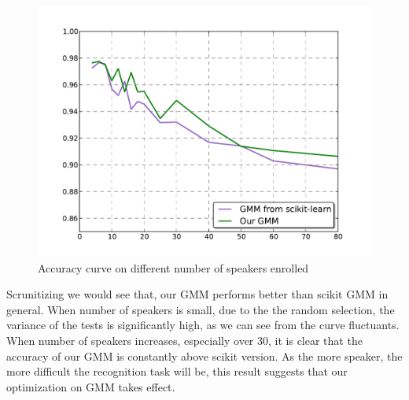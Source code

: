 \begin{figure}[!ht]
	\label{fig:nspk_enrolled}
	\centering
	\includegraphics[width=\linewidth]{res/nperson.pdf}
	\caption{Accuracy curve on different number of speakers enrolled}
\end{figure}

Scrunitizing  we would see that, our GMM performs better than
scikit GMM in general. When number of speakers is small, due to the the random
selection, the variance of the tests is significantly high, as we can see from the curve fluctuants.
When number of speakers increases, especially over 30, it is clear that the
accuracy of our GMM is constantly above scikit version. As the more speaker,
the more difficult the recognition task will be, this result suggests that our
optimization on GMM takes effect.


